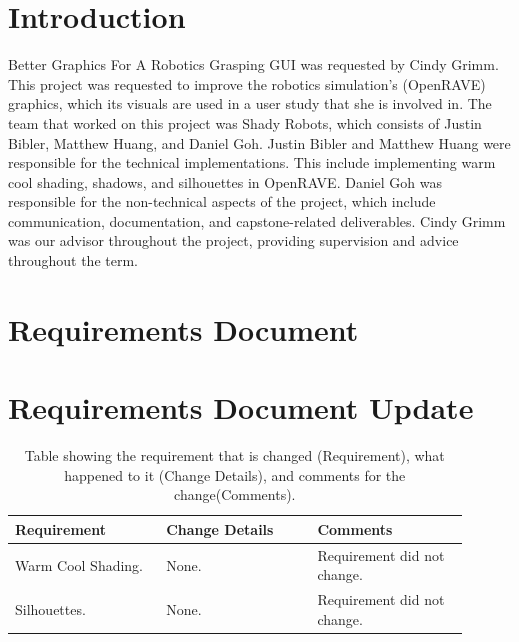 \documentclass[10pt,journal,compsoc,draftclsnofoot]{IEEEtran}
\begin{document}
\begin{flushleft}

\tableofcontents

\newpage

\section{Introduction}
Better Graphics For A Robotics Grasping GUI was requested by Cindy Grimm.
This project was requested to improve the robotics simulation's (OpenRAVE) graphics, which its visuals are used in a user study that she is involved in.
The team that worked on this project was Shady Robots, which consists of Justin Bibler, Matthew Huang, and Daniel Goh.
Justin Bibler and Matthew Huang were responsible for the technical implementations.
This include implementing warm cool shading, shadows, and silhouettes in OpenRAVE.
Daniel Goh was responsible for the non-technical aspects of the project, which include communication, documentation, and capstone-related deliverables.
Cindy Grimm was our advisor throughout the project, providing supervision and advice throughout the term. 
\newpage

\section{Requirements Document}

\newpage



\section{Requirements Document Update}

\begin{center}
\begin{table}[H]
\caption{Table showing the requirement that is changed (Requirement), what happened to it (Change Details), and comments for the change(Comments).}
\begin{tabular}{ | p{0.3\linewidth} | p{0.3\linewidth} | p{0.3\linewidth} | }
\hline
\textbf{Requirement}  & \textbf{Change Details}  & \textbf{Comments} \\ \hline

Warm Cool Shading. & 
None. & 
Requirement did not change. \\ \hline

Silhouettes. & 
None. & 
Requirement did not change. \\ \hline


\end{tabular}
\end{table}
\end{center}
\end{flushleft}
\end{document}
